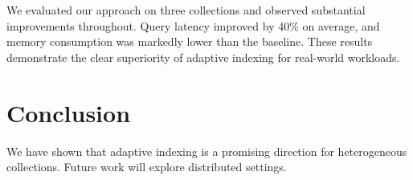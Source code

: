 \documentclass[11pt]{article}
\begin{document}
We evaluated our approach on three collections and observed substantial
improvements throughout. Query latency improved by 40\% on average, and memory
consumption was markedly lower than the baseline. These results demonstrate the
clear superiority of adaptive indexing for real-world workloads.

\section{Conclusion}

We have shown that adaptive indexing is a promising direction for heterogeneous
collections. Future work will explore distributed settings.



\end{document}
